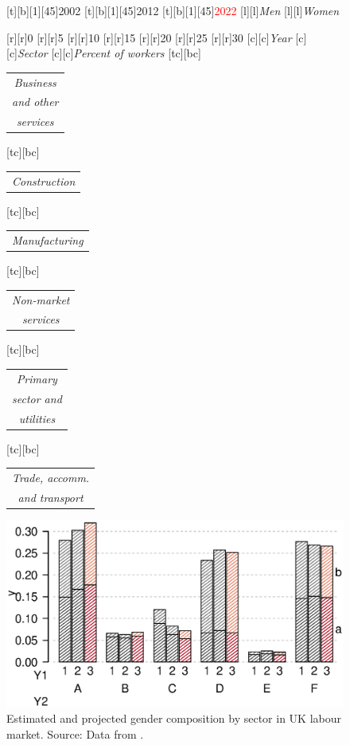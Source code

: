 \documentclass[11 pt, a4paper]{report}
\renewcommand{\arraystretch}{1.2}
\begin{document}
\begin{figure}[hbtp!]
[t][b][1][45]{\small{2002}}
[t][b][1][45]{\small{2012}}
[t][b][1][45]{\small{\textcolor{red}{2022}}}
[l][l]{\scriptsize{\emph{Men}}}
[l][l]{\scriptsize{\emph{Women}}}


[r][r]{\scriptsize{0}}
[r][r]{\scriptsize{5}}
[r][r]{\scriptsize{10}}
[r][r]{\scriptsize{15}}
[r][r]{\scriptsize{20}}
[r][r]{\scriptsize{25}}
[r][r]{\scriptsize{30}}
[c][c]{\scriptsize{\emph{Year}}}
[c][c]{\scriptsize{\emph{Sector}}}
[c][c]{\scriptsize{\emph{Percent of workers}}}
\renewcommand{\arraystretch}{0.7}
[tc][bc]{\scriptsize{
\begin{tabular}{c}
\emph{Business}\\
\emph{and other }\\
\emph{services}
\end{tabular}
}}
[tc][bc]{\scriptsize{
\begin{tabular}{c}
\emph{Construction}
\end{tabular}
}}
[tc][bc]{\scriptsize{
\begin{tabular}{c}
\emph{Manufacturing}
\end{tabular}
}}

[tc][bc]{\scriptsize{
\begin{tabular}{c}
\emph{Non-market}\\
\emph{services}
\end{tabular}
}}
[tc][bc]{\scriptsize{
\begin{tabular}{c}
\emph{Primary }\\
\emph{sector and }\\
\emph{utilities}
\end{tabular}
}}
[tc][bc]{\scriptsize{
\begin{tabular}{c}
\emph{Trade, accomm.}\\
\emph{and transport}
\end{tabular}
}}
\centering
\includegraphics[width=\textwidth]{../figures/Fig5.9.eps}
\caption{Estimated and projected gender composition by sector in UK labour market. Source: Data from \citet{Wilson2014}.}\label{Fig:592}
\end{figure}
\end{document}
